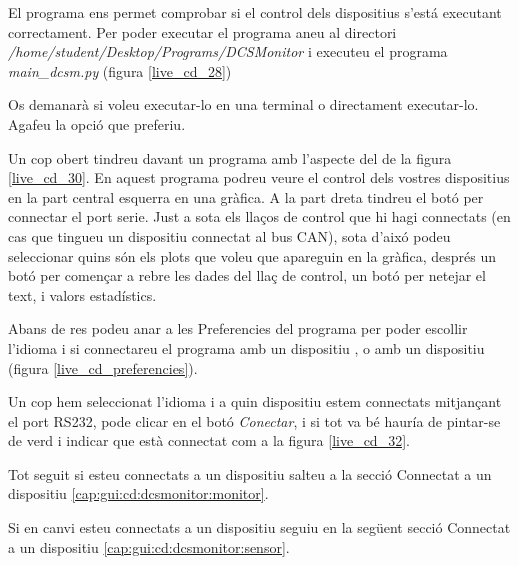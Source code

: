 El programa \DCSMonitor ens permet comprobar si el control dels dispositius s'está executant correctament. Per poder executar el programa aneu al directori \emph{/home/student/Desktop/Programs/DCSMonitor} i executeu el programa \emph{main\_dcsm.py} (figura \ref{live_cd_28})

Os demanarà si voleu executar-lo en una terminal o directament executar-lo. Agafeu la opció que preferiu.

Un cop obert tindreu davant un programa amb l'aspecte del de la figura \ref{live_cd_30}. En aquest programa podreu veure el control dels vostres dispositius en la part central esquerra en una gràfica. A la part dreta tindreu el botó per connectar el port serie. Just a sota els llaços de control que hi hagi connectats (en cas que tingueu un dispositiu \Monitor connectat al bus CAN), sota d'aixó podeu seleccionar quins són els plots que voleu que apareguin en la gràfica, després un botó per començar a rebre les dades del llaç de control, un botó per netejar el text, i valors estadístics.


Abans de res podeu anar a les Preferencies del programa per poder escollir l'idioma i si connectareu el programa amb un dispositiu \Monitor, o amb un dispositiu \SensorActuador (figura \ref{live_cd_preferencies}).


Un cop hem seleccionat l'idioma i a quin dispositiu estem connectats mitjançant el port RS232, pode clicar en el botó \emph{Conectar}, i si tot va bé hauría de pintar-se de verd i indicar que està connectat com a la figura \ref{live_cd_32}.


Tot seguit si esteu connectats a un dispositiu \Monitor salteu a la secció Connectat a un dispositiu \Monitor \ref{cap:gui:cd:dcsmonitor:monitor}.

Si en canvi esteu connectats a un dispositiu \SensorActuador seguiu en la següent secció Connectat a un dispositiu \SensorActuador \ref{cap:gui:cd:dcsmonitor:sensor}.

